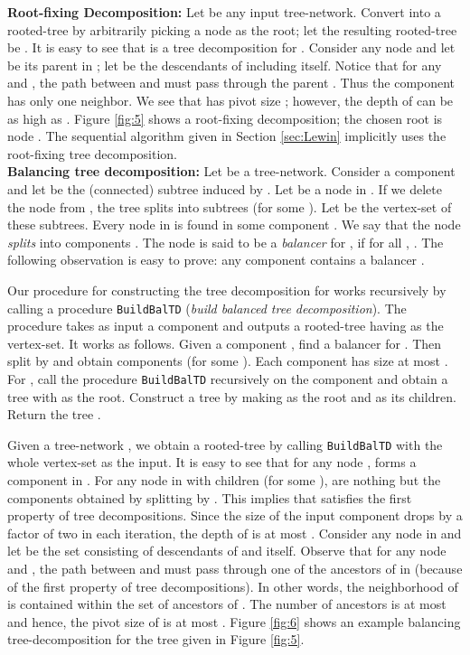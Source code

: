 \documentclass[11pt]{article}
\newcommand{\BuildBTD} {{\tt BuildBalTD}}
\begin{document}
\noindent
{\bf Root-fixing Decomposition: } 
Let  be any input tree-network. Convert  into a rooted-tree by 
arbitrarily picking a node  as the root; let the resulting rooted-tree be .
It is easy to see that  is a tree decomposition for .
Consider any node  and let  be its parent in ; let  be the descendants of  including  itself.
Notice that for any  and , the path between  and  must pass through
the parent . Thus the component  has only one neighbor.
We see that  has pivot size ; however, the depth of  can be as high as .
Figure \ref{fig:5} shows a root-fixing decomposition; the chosen root is node .
The sequential algorithm given in Section \ref{sec:Lewin} implicitly uses the root-fixing tree decomposition.
\\

\noindent
{\bf Balancing tree decomposition: }
Let  be a tree-network. Consider a component 
and let  be the (connected) subtree induced by .
Let  be a node in . If we delete the node  from ,
the tree  splits into subtrees  (for some ).
Let  be the vertex-set of these subtrees.
Every node in  is found in some component .
We say that the node  {\em splits}  into components .
The node  is said to be a {\em balancer} for , if for all , .
The following observation is easy to prove:
any component  contains a balancer .

Our procedure for constructing the tree decomposition for  works recursively
by calling a procedure {\BuildBTD} ({\em build balanced tree decomposition}).
The procedure takes as input a component  and outputs a rooted-tree
having  as the vertex-set. It works as follows.
Given a component , find a balancer  for .
Then split  by  and obtain components  (for some ).
Each component  has size at most .
For , call the procedure {\BuildBTD} recursively on the component 
and obtain a tree  with  as the root. Construct a tree  by making  as the root
and  as its children. Return the tree .

Given a tree-network , we obtain a rooted-tree  by calling {\BuildBTD} with the whole
vertex-set  as the input. 
It is easy to see that for any node ,  forms a component in .
For any node  in  with children  (for some ),
 are nothing but the components obtained by splitting  by .
This implies that  satisfies the first property of tree decompositions.
Since the size of the input component drops by a factor of two in each iteration,
the depth of  is at most .
Consider any node  in  and let  be the set consisting of descendants of  and  itself.
Observe that for any node  and , the path between  and 
must pass through one of the ancestors of  in  (because of the first property of tree decompositions).
In other words, the neighborhood of  is contained within the set of ancestors of .
The number of ancestors is at most  and
hence, the pivot size of  is at most .
Figure \ref{fig:6} shows an example balancing tree-decomposition for the tree given in Figure \ref{fig:5}.
\end{document}
